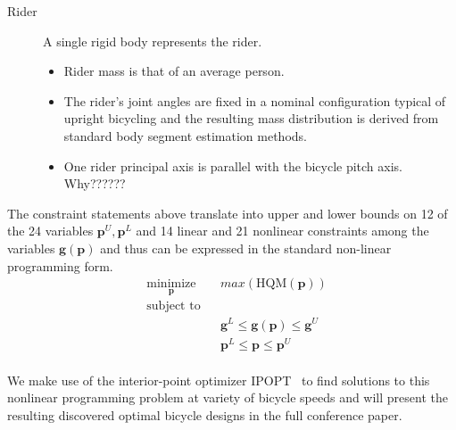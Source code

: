 \documentclass{bmd2019a}
\begin{document}
\begin{description}
  \item[Rider] A single rigid body represents the rider.
    \begin{itemize}
      \itemsep0em
      \item Rider mass is that of an average person.
      \item The rider's joint angles are fixed in a nominal configuration typical of upright bicycling and the resulting mass distribution is derived from standard body segment estimation methods.
      \item One rider principal axis is parallel with the bicycle pitch axis. Why??????
    \end{itemize}

\end{description}

The constraint statements above translate into upper and lower bounds on 12 of
the 24 variables $\mathbf{p}^U,\mathbf{p}^L$ and 14 linear and 21 nonlinear
constraints among the variables $\mathbf{g}(\mathbf{p})$ and thus can be
expressed in the standard non-linear programming form.
%
\begin{equation}
  \begin{aligned}
    & \underset{\mathbf{p}}{\text{minimize}} & & max(\textrm{HQM}(\mathbf{p})) \\
    & \text{subject to} & & \\
    & & & \mathbf{g}^L \leq \mathbf{g}(\mathbf{p}) \leq \mathbf{g}^U \\
    & & & \mathbf{p}^L \leq \mathbf{p} \leq \mathbf{p}^U \\
  \end{aligned}
\end{equation}

We make use of the interior-point optimizer IPOPT~\cite{Wachter2006} to find
solutions to this nonlinear programming problem at variety of bicycle speeds
and will present the resulting discovered optimal bicycle designs in the full
conference paper.



\end{document}
